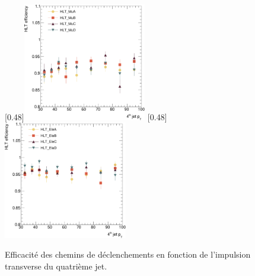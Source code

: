 \begin{figure}[tbp] \centering
    [0.48\textwidth]{\includegraphics[width=0.48\textwidth]{chapitre7/figs/HLT/HLTturnon_mu_fourthJet_zoom.pdf}}
    [0.48\textwidth]{\includegraphics[width=0.48\textwidth]{chapitre7/figs/HLT/HLTturnon_el_fourthJet_zoom.pdf}}
    \caption{Efficacité des chemins de déclenchements en fonction de l'impulsion transverse du quatrième jet.}
    \label{fig:trig_eff}
\end{figure}



